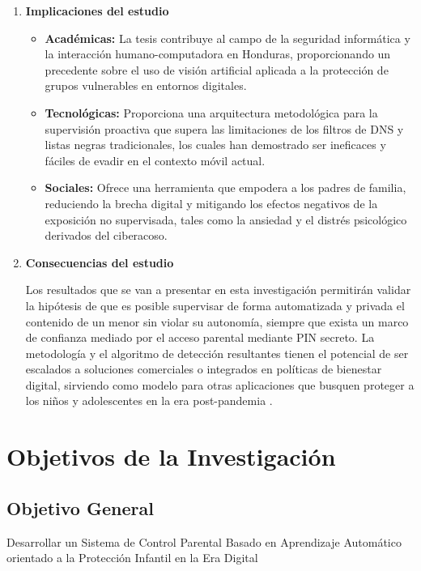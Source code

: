 \begin{enumerate}
    \item \textbf{Implicaciones del estudio} 
    
    \begin{itemize}
        \item \textbf{Académicas:} La tesis contribuye al campo de la seguridad informática y la interacción humano-computadora en Honduras, proporcionando un precedente sobre el uso de visión artificial aplicada a la protección de grupos vulnerables en entornos digitales.
        
        \item \textbf{Tecnológicas:} Proporciona una arquitectura metodológica para la supervisión proactiva que supera las limitaciones de los filtros de DNS y listas negras tradicionales, los cuales han demostrado ser ineficaces y fáciles de evadir en el contexto móvil actual.
        
        \item \textbf{Sociales:} Ofrece una herramienta que empodera a los padres de familia, reduciendo la brecha digital y mitigando los efectos negativos de la exposición no supervisada, tales como la ansiedad y el distrés psicológico derivados del ciberacoso.
    \end{itemize}
    
    \item \textbf{Consecuencias del estudio}
    
    Los resultados que se van a presentar en esta investigación permitirán validar la hipótesis de que es posible supervisar de forma automatizada y privada el contenido de un menor sin violar su autonomía, siempre que exista un marco de confianza mediado por el acceso parental mediante PIN secreto. La metodología y el algoritmo de detección resultantes tienen el potencial de ser escalados a soluciones comerciales o integrados en políticas de bienestar digital, sirviendo como modelo para otras aplicaciones que busquen proteger a los niños y adolescentes en la era post-pandemia \cite{limone_psychological_2021, noauthor_full_2025}.
\end{enumerate}

\section{Objetivos de la Investigación}
\subsection{Objetivo General}
Desarrollar un Sistema de Control Parental Basado en Aprendizaje Automático orientado a la Protección Infantil en la Era Digital
